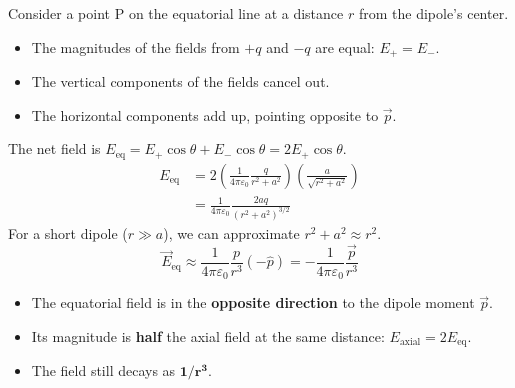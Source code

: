\begin{frame}
\begin{frame}
\begin{keybox}
\vspace{0.1cm}
Consider a point P on the equatorial line at a distance $r$ from the dipole's center.
\begin{itemize}
    \item The magnitudes of the fields from $+q$ and $-q$ are equal: $E_{+} = E_{-}$.
    \item The vertical components of the fields cancel out.
    \item The horizontal components add up, pointing opposite to $\vec{p}$.
\end{itemize}
\vspace{0.1cm}
\end{keybox}

\vspace{0.3cm}

\begin{formulabox}
\vspace{0.1cm}
The net field is $E_{\text{eq}} = E_{+} \cos\theta + E_{-} \cos\theta = 2E_{+} \cos\theta$.
\begin{align*}
E_{\text{eq}} &= 2 \left( \frac{1}{4\pi\varepsilon_0} \frac{q}{r^2+a^2} \right) \left( \frac{a}{\sqrt{r^2+a^2}} \right) \\
&= \frac{1}{4\pi\varepsilon_0} \frac{2aq}{(r^2+a^2)^{3/2}}
\end{align*}
For a short dipole ($r \gg a$), we can approximate $r^2+a^2 \approx r^2$.
\begin{equation*}
\boxed{\vec{E}_{\text{eq}} \approx \frac{1}{4\pi\varepsilon_0} \frac{p}{r^3} (-\hat{p}) = -\frac{1}{4\pi\varepsilon_0} \frac{\vec{p}}{r^3}}
\end{equation*}
\end{formulabox}

\vspace{0.3cm}

\begin{importantbox}
\vspace{0.1cm}
\begin{itemize}
    \item The equatorial field is in the \textbf{opposite direction} to the dipole moment $\vec{p}$.
    \item Its magnitude is \textbf{half} the axial field at the same distance: $E_{\text{axial}} = 2 E_{\text{eq}}$.
    \item The field still decays as $\mathbf{1/r^3}$.
\end{itemize}
\vspace{0.1cm}
\end{importantbox}


\end{frame}
\end{frame}
